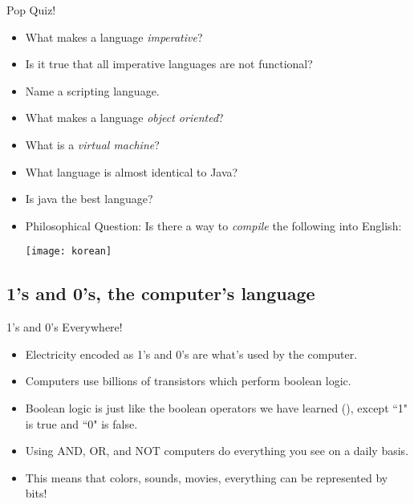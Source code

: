 \begin{frame}{Pop Quiz!}
\begin{itemize}
\item What makes a language \emph{imperative}? \pause
\item Is it true that all imperative languages are not functional? \pause
\item Name a scripting language. \pause
\item What makes a language \emph{object oriented}? \pause
\item What is a \emph{virtual machine}? \pause
\item What language is almost identical to Java? \pause
\item Is java the best language? \pause
\item Philosophical Question: Is there a way to \emph{compile} the following into English:\\
\begin{center}
\texttt{[image: korean]}
\end{center}
\end{itemize}
\end{frame}

\subsection{1's and 0's, the computer's language}
\begin{frame}{1's and 0's Everywhere!}
\begin{itemize}
\item Electricity encoded as 1's and 0's are what's used by the computer. \pause
\item Computers use billions of transistors which perform boolean logic.
\item Boolean logic is just like the boolean operators we have learned (\code{\texttt{\&\&, ||, !}}), except ``1" is true and ``0" is false. \pause
\item Using AND, OR, and NOT computers do everything you see on a daily basis.
\item This means that colors, sounds, movies, everything can be represented by bits! \pause
\end{itemize}
\end{frame}

